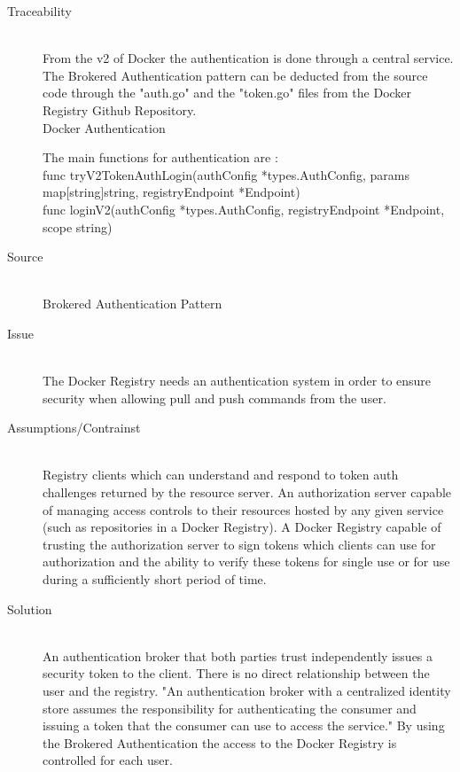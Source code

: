 \begin{description}

\item[Traceability]~\\
From the v2 of Docker the authentication is done through a central service. \\
The Brokered Authentication pattern can be deducted from the source code through the "auth.go" and the "token.go" files from the Docker Registry Github Repository. \\
Docker Authentication \cite{dockauth}

The main functions for authentication are : \\
func tryV2TokenAuthLogin(authConfig *types.AuthConfig, params map[string]string, registryEndpoint *Endpoint) \\
func loginV2(authConfig *types.AuthConfig, registryEndpoint *Endpoint, scope string) 


\item[Source]~\\
Brokered Authentication Pattern\cite{brokeredauth} \\

\item[Issue]~\\ The Docker Registry needs an authentication system in order to ensure security when allowing pull and push commands from the user.

\item[Assumptions/Contrainst]~\\ 

    Registry clients which can understand and respond to token auth challenges returned by the resource server.
    An authorization server capable of managing access controls to their resources hosted by any given service (such as repositories in a Docker Registry).
    A Docker Registry capable of trusting the authorization server to sign tokens which clients can use for authorization and the ability to verify these tokens for single use or for use during a sufficiently short period of time.


\item[Solution]~\\ 
An authentication broker that both parties trust independently issues a security token to the client. There is no direct relationship between the user and the registry.
"An authentication broker with a centralized identity store assumes the responsibility for authenticating the consumer and issuing a token that the consumer can use to access the service."
By using the Brokered Authentication the access to the Docker Registry is controlled for each user.


\end{description}
